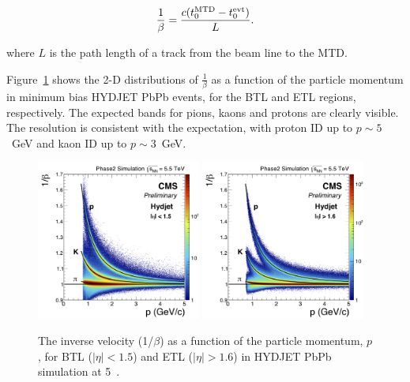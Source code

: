 \begin{equation}
\frac{1}{\beta}=\frac{c(t_{0}^{\rm MTD}-t_{0}^{\rm evt})}{L}.
\end{equation}

\noindent where $L$ is the path length of a track from the beam line to the MTD.

Figure~\ref{fig:betavsp} shows the 2-D distributions of
$\frac{1}{\beta}$ as a function of the particle momentum in minimum
bias HYDJET PbPb events, for the BTL and ETL regions,
respectively. The expected bands for pions, kaons and protons are
clearly visible. The resolution is consistent with the expectation,
with proton ID up to $p \sim 5$~GeV and kaon ID up to $p \sim 3$~GeV.  

\begin{figure}[thb]
\centering
\includegraphics[width=0.48\textwidth]{fig/performance/cInvTOF_MC_Hydjet_RERECO_PbPb_BTL_Inc.png}
\includegraphics[width=0.48\textwidth]{fig/performance/cInvTOF_MC_Hydjet_RERECO_PbPb_ETL_Inc.png}
\vspace{-0.2cm}
  \caption{ \label{fig:betavsp} The inverse velocity (1/$\beta$) as a
    function of the particle momentum, $p$, for BTL ($|\eta|<1.5$) and ETL ($|\eta|>1.6$) in HYDJET PbPb simulation at 5~\TeV.}
\end{figure}

